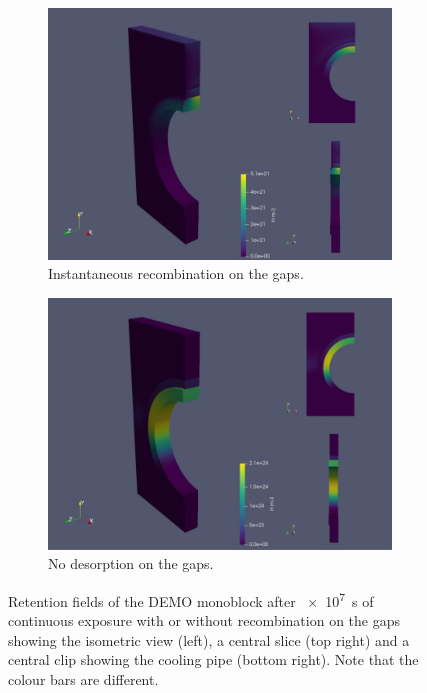 \begin{figure} [h]
    \centering
    \begin{subfigure}{\linewidth}
        \centering
        \includegraphics[width=\linewidth]{Figures/Chapter3/monoblocks/3D_monoblocks/MB 3D desorption.png}
        \caption{Instantaneous recombination on the gaps.}
    \end{subfigure}
    \begin{subfigure}{\linewidth}
        \centering
        \includegraphics[width=\linewidth]{Figures/Chapter3/monoblocks/3D_monoblocks/MB 3D no desorption.png}
        \caption{No desorption on the gaps.}
    \end{subfigure}
    \caption{Retention fields of the DEMO monoblock after \SI{e7}{s} of continuous exposure with or without recombination on the gaps showing the isometric view (left), a central slice (top right) and a central clip showing the cooling pipe (bottom right). Note that the colour bars are different.}
    \label{fig:retention fields 3D monoblocks}
\end{figure}

